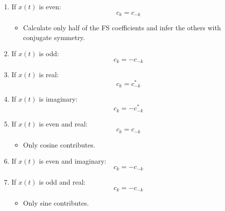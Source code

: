 \begin{intuition}
    \begin{enumerate}
        \item If $x(t)$ is even: 
        \begin{equation*}
            c_k = c_{-k}
        \end{equation*}
        \begin{itemize}
            \item Calculate only half of the FS coefficients and infer the others with conjugate symmetry.
        \end{itemize}
        \item If $x(t)$ is odd:
        \begin{equation*}
            c_k = - c_{-k}
        \end{equation*}
        \item If $x(t)$ is real:
        \begin{equation*}
            c_k = c_{-k}^*
        \end{equation*}
        \item If $x(t)$ is imaginary:
        \begin{equation*}
            c_k = - c_{-k}^*
        \end{equation*}    
        \item If \( x(t) \) is even and real: 
        \begin{equation*}
            c_k = c_{-k}
        \end{equation*}
        \begin{itemize}
            \item Only cosine contributes.
        \end{itemize}
        
        \item If \( x(t) \) is even and imaginary: 
        \begin{equation*}
            c_k = -c_{-k}
        \end{equation*}
    
        \item If \( x(t) \) is odd and real: 
        \begin{equation*}
            c_k = -c_{-k}
        \end{equation*}
        \begin{itemize}
            \item Only sine contributes.
        \end{itemize}
    

\end{enumerate}
\end{intuition}
